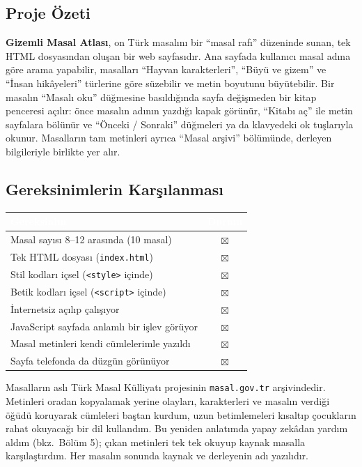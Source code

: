 \documentclass[12pt,a4paper]{article}
\begin{document}
\subsection{Proje Özeti}
\textbf{Gizemli Masal Atlası}, on Türk masalını bir ``masal rafı'' düzeninde sunan, tek
HTML dosyasından oluşan bir web sayfasıdır. Ana sayfada kullanıcı masal adına göre arama
yapabilir, masalları ``Hayvan karakterleri'', ``Büyü ve gizem'' ve ``İnsan hikâyeleri''
türlerine göre süzebilir ve metin boyutunu büyütebilir. Bir masalın ``Masalı oku'' düğmesine
basıldığında sayfa değişmeden bir kitap penceresi açılır: önce masalın adının yazdığı kapak
görünür, ``Kitabı aç'' ile metin sayfalara bölünür ve ``Önceki / Sonraki'' düğmeleri ya da
klavyedeki ok tuşlarıyla okunur. Masalların tam metinleri ayrıca ``Masal arşivi''
bölümünde, derleyen bilgileriyle birlikte yer alır.

\subsection{Gereksinimlerin Karşılanması}
\begin{center}
\begin{tabular}{@{}p{8.2cm}c@{}}
\toprule
\rowcolor{ana}\textcolor{white}{\textbf{Gereksinim}} & \textcolor{white}{\textbf{Durum}} \\
\midrule
Masal sayısı 8--12 arasında (10 masal)              & $\boxtimes$ \\
Tek HTML dosyası (\texttt{index.html})              & $\boxtimes$ \\
Stil kodları içsel (\texttt{<style>} içinde)        & $\boxtimes$ \\
Betik kodları içsel (\texttt{<script>} içinde)      & $\boxtimes$ \\
İnternetsiz açılıp çalışıyor                        & $\boxtimes$ \\
JavaScript sayfada anlamlı bir işlev görüyor        & $\boxtimes$ \\
Masal metinleri kendi cümlelerimle yazıldı          & $\boxtimes$ \\
Sayfa telefonda da düzgün görünüyor                 & $\boxtimes$ \\
\bottomrule
\end{tabular}
\end{center}
Masalların aslı Türk Masal Külliyatı projesinin \texttt{masal.gov.tr} arşivindedir. Metinleri
oradan kopyalamak yerine olayları, karakterleri ve masalın verdiği öğüdü koruyarak cümleleri
baştan kurdum, uzun betimlemeleri kısaltıp çocukların rahat okuyacağı bir dil kullandım. Bu
yeniden anlatımda yapay zekâdan yardım aldım (bkz.\ Bölüm 5); çıkan metinleri tek tek okuyup
kaynak masalla karşılaştırdım. Her masalın sonunda kaynak ve derleyenin adı yazılıdır.
\end{document}
